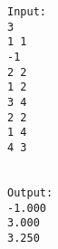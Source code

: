 \begin{verbatim}
Input:
3
1 1
-1
2 2
1 2
3 4
2 2
1 4
4 3


Output:
-1.000
3.000
3.250
\end{verbatim}